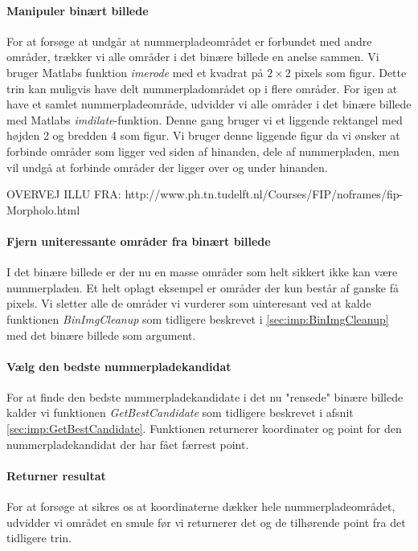 \paragraph{Manipuler binært billede}
For at forsøge at undgår at nummerpladeområdet er forbundet med andre områder, trækker vi alle områder i det binære billede en anelse sammen. Vi bruger Matlabs funktion \textit{imerode} med et kvadrat på $2 \times 2$ pixels som figur. Dette trin kan muligvis have delt nummerpladområdet op i flere områder. For igen at have et samlet nummerpladeområde, udvidder vi alle områder i det binære billede med Matlabs \textit{imdilate}-funktion. Denne gang bruger vi et liggende rektangel med højden 2 og bredden 4 som figur. Vi bruger denne liggende figur da vi ønsker at forbinde områder som ligger ved siden af hinanden, dele af nummerpladen, men vil undgå at forbinde områder der ligger over og under hinanden. 

OVERVEJ ILLU FRA: http://www.ph.tn.tudelft.nl/Courses/FIP/noframes/fip-Morpholo.html

\paragraph{Fjern uniteressante områder fra binært billede}
I det binære billede er der nu en masse områder som helt sikkert ikke kan være nummerpladen. Et helt oplagt eksempel er områder der kun består af ganske få pixels. Vi sletter alle de områder vi vurderer som uinteresant ved at kalde funktionen \textit{BinImgCleanup} som tidligere beskrevet i \vref{sec:imp:BinImgCleanup} med det binære billede som argument.


\paragraph{Vælg den bedste nummerpladekandidat}
For at finde den bedste nummerpladekandidate i det nu "rensede" binære billede kalder vi funktionen \textit{GetBestCandidate} som tidligere beskrevet i afsnit \vref{sec:imp:GetBestCandidate}. Funktionen returnerer koordinater og point for den nummerpladekandidat der har fået færrest point. 


\paragraph{Returner resultat}
For at forsøge at sikres os at koordinaterne dækker hele nummerpladeområdet, udvidder vi området en smule før vi returnerer det og de tilhørende point fra det tidligere trin. 


